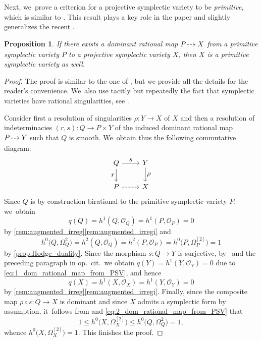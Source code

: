 \documentclass[JEP,XML,SOM,Unicode,published]{cedram}
\let\ts\textstyle
\newcommand{\dradpl}{{\hspace*{-2.5mm}\begin{tikzcd}[ampersand replacement=\&,column sep = scriptsize]\mbox{}\ar[r,dashed]\&\mbox{}\end{tikzcd}\hspace*{-2.5mm}}}
\newcommand{\dratst}{{\hspace*{-2.5mm}\begin{tikzcd}[ampersand replacement=\&,column sep = small]\mbox{}\ar[r,dashed]\&\mbox{}\end{tikzcd}\hspace*{-2mm}}}
\let\drascst\dratst
\newcommand{\dra}{\mathchoice{\dradpl}{\dratst}{\drascst}{\drascst}}
\theoremstyle{plain}
\newtheorem{prop}[thm]{Proposition}
\theoremstyle{definition}
\newcommand{\OO}{\mathcal{O}}
\begin{document}
Next, we~prove a criterion for a projective symplectic variety to be \emph{primitive}, which is similar to \cite[Prop.\,3.15]{BCGPSV26}. This result plays a key role in the paper and slightly generalizes the recent \cite[Prop.\,3.14]{BCGPSV26}.

\begin{prop}
\label{prop:dom_rational_map_from_PSV}
If there exists a dominant rational map $P \dra X$ from a primitive symplectic variety $P$ to a projective symplectic variety $X$, then $X$ is a primitive symplectic variety as well.
\end{prop}

\begin{proof}
The proof is similar to the one of \cite[Prop.\,3.14]{BCGPSV26}, but we provide all the details for the reader's convenience. We~also use tacitly but repeatedly the fact that symplectic varieties have rational singularities, see \cite[Prop.\,1.3]{Beauville00a}.

Consider first a resolution of singularities $\rho \colon Y \rightarrow X$ of $X$ and then a resolution of indeterminacies $(r,s) \colon Q \to P \times Y$ of the induced dominant rational map $P \dra Y$ such that $Q$ is smooth. We~obtain thus the following commutative diagram:
\[
\begin{tikzcd}[row sep = normal]
Q \arrow[d, "\ts r" swap] \arrow[r, "\ts s"] & Y \arrow[d, "\ts \rho"] \\
P \arrow[r, dashed] & X
\end{tikzcd}
\]
Since $Q$ is by construction birational to the primitive symplectic variety $P$, we~obtain
\begin{equation}
\label{eq:1_dom_rational_map_from_PSV}
q(Q) = h^1(Q,\OO_Q) = h^1(P, \OO_P) = 0
\end{equation}
by \autoref{rem:augmented_irreg}\eqref{rem:augmented_irregi} and
\begin{equation}
\label{eq:2_dom_rational_map_from_PSV}
h^0 \bigl(Q,\Omega^{2}_Q \bigr) = h^2(Q, \OO_Q) = h^2(P, \OO_P) = h^0 \bigl(P,\Omega^{[2]}_P \bigr) = 1
\end{equation}
by \autoref{prop:Hodge_duality}. Since the morphism $s \colon Q \to Y$ is surjective, by~\cite[Lem.\,7.28]{Voisin07book_I} and the preceding paragraph in op.\ cit.\ we obtain $q(Y) = h^1(Y,\OO_Y) = 0$ due to \eqref{eq:1_dom_rational_map_from_PSV}, and hence
\[
q(X) = h^1(X,\OO_X) = h^1(Y,\OO_Y) = 0
\]
by \autoref{rem:augmented_irreg}\eqref{rem:augmented_irregi}.
Finally, since the composite map $\rho \circ s \colon Q \to X$ is dominant and since $X$ admits a symplectic form by assumption, it~follows from \cite[Prop.\,5.8]{Kebekus13a} and \eqref{eq:2_dom_rational_map_from_PSV} that
\[
1 \leq h^0 \bigl(X,\Omega^{[2]}_X \bigr) \leq h^0 \bigl(Q,\Omega^{2}_Q \bigr) = 1,
\]
whence $h^0 \bigl(X,\Omega^{[2]}_X \bigr) = 1$. This finishes the proof.
\end{proof}
\end{document}
